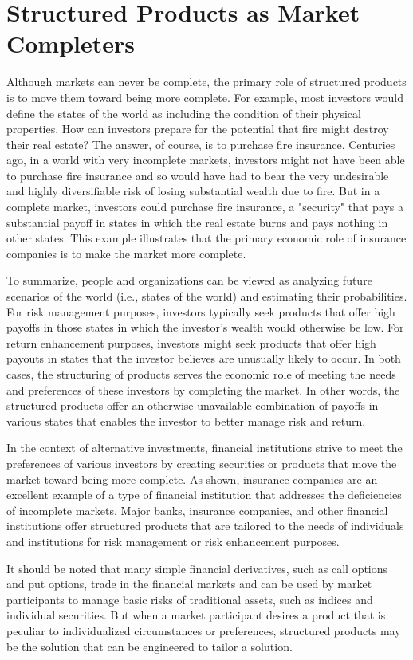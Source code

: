 \documentclass[11pt]{article}
\begin{document}
\section*{Structured Products as Market Completers}
Although markets can never be complete, the primary role of structured products is to move them toward being more complete. For example, most investors would define the states of the world as including the condition of their physical properties. How can investors prepare for the potential that fire might destroy their real estate? The answer, of course, is to purchase fire insurance. Centuries ago, in a world with very incomplete markets, investors might not have been able to purchase fire insurance and so would have had to bear the very undesirable and highly diversifiable risk of losing substantial wealth due to fire. But in a complete market, investors could purchase fire insurance, a "security" that pays a substantial payoff in states in which the real estate burns and pays nothing in other states. This example illustrates that the primary economic role of insurance companies is to make the market more complete.

To summarize, people and organizations can be viewed as analyzing future scenarios of the world (i.e., states of the world) and estimating their probabilities. For risk management purposes, investors typically seek products that offer high payoffs in those states in which the investor's wealth would otherwise be low. For return enhancement purposes, investors might seek products that offer high payouts in states that the investor believes are unusually likely to occur. In both cases, the structuring of products serves the economic role of meeting the needs and preferences of these investors by completing the market. In other words, the structured products offer an otherwise unavailable combination of payoffs in various states that enables the investor to better manage risk and return.

In the context of alternative investments, financial institutions strive to meet the preferences of various investors by creating securities or products that move the market toward being more complete. As shown, insurance companies are an excellent example of a type of financial institution that addresses the deficiencies of incomplete markets. Major banks, insurance companies, and other financial institutions offer structured products that are tailored to the needs of individuals and institutions for risk management or risk enhancement purposes.

It should be noted that many simple financial derivatives, such as call options and put options, trade in the financial markets and can be used by market participants to manage basic risks of traditional assets, such as indices and individual securities. But when a market participant desires a product that is peculiar to individualized circumstances or preferences, structured products may be the solution that can be engineered to tailor a solution.
\end{document}
